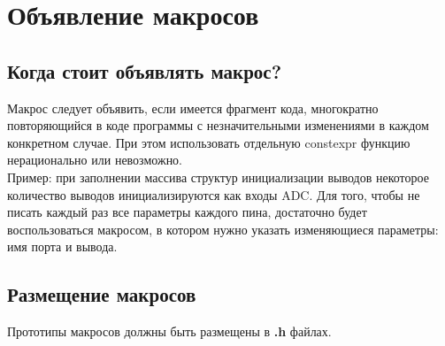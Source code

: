 \chapter{Объявление макросов}\label{mackros:0}
\section{Когда стоит объявлять макрос?}
Макрос следует объявить, если имеется фрагмент кода, многократно повторяющийся в коде программы с незначительными изменениями в каждом конкретном случае. При этом использовать отдельную constexpr функцию нерационально или невозможно.\\Пример: при заполнении массива структур инициализации выводов некоторое количество выводов инициализируются как входы ADC. Для того, чтобы не писать каждый раз все параметры каждого пина, достаточно будет воспользоваться макросом, в котором нужно указать изменяющиеся параметры: имя порта и вывода.

\section{Размещение макросов}
Прототипы макросов должны быть размещены в \textbf{.h} файлах.

